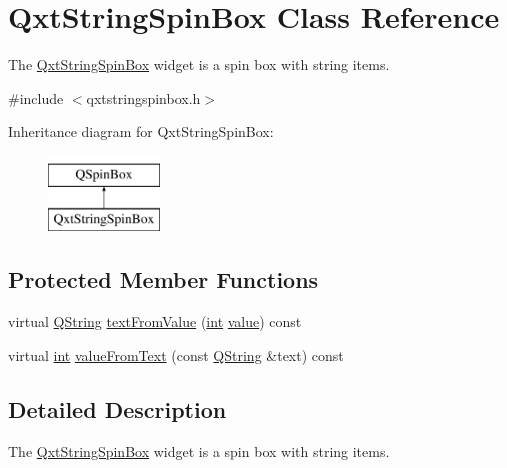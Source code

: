 \hypertarget{class_qxt_string_spin_box}{\section{Qxt\-String\-Spin\-Box Class Reference}
\label{class_qxt_string_spin_box}
}


The \hyperlink{class_qxt_string_spin_box}{Qxt\-String\-Spin\-Box} widget is a spin box with string items.  




{\ttfamily \#include $<$qxtstringspinbox.\-h$>$}

Inheritance diagram for Qxt\-String\-Spin\-Box\-:\begin{figure}[H]
\begin{center}
\leavevmode
\includegraphics[height=2.000000cm]{class_qxt_string_spin_box}
\end{center}
\end{figure}
\subsection*{Protected Member Functions}
\begin{DoxyCompactItemize}
\item 
virtual \hyperlink{group___u_a_v_objects_plugin_gab9d252f49c333c94a72f97ce3105a32d}{Q\-String} \hyperlink{class_qxt_string_spin_box_ae7e1ec642e7021aacc311b09c7ed691c}{text\-From\-Value} (\hyperlink{ioapi_8h_a787fa3cf048117ba7123753c1e74fcd6}{int} \hyperlink{glext_8h_aa0e2e9cea7f208d28acda0480144beb0}{value}) const 
\item 
virtual \hyperlink{ioapi_8h_a787fa3cf048117ba7123753c1e74fcd6}{int} \hyperlink{class_qxt_string_spin_box_a9c72edf3740dcdb5bd93367f4eac5f05}{value\-From\-Text} (const \hyperlink{group___u_a_v_objects_plugin_gab9d252f49c333c94a72f97ce3105a32d}{Q\-String} \&text) const 
\end{DoxyCompactItemize}


\subsection{Detailed Description}
The \hyperlink{class_qxt_string_spin_box}{Qxt\-String\-Spin\-Box} widget is a spin box with string items. 

